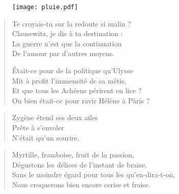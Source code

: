 \begin{figure}[h]
\centering
\texttt{[image: pluie.pdf]}
\captionsetup{labelformat=empty}
\caption[Idéotexte de la ]{}
\end{figure}

\begin{verse}
Te croyais-tu sur la redoute si malin ?\\
Clausewitz, je  dis à ta destination :\\
La guerre n’est que la continuation\\
De l’amour par d’autres moyens.

Était-ce pour de la politique qu’Ulysse\\
Mit à profit  l’immensité de sa métis,\\
Et que tous les Achéens périrent en lice ?\\
Ou bien était-ce pour ravir Hélène à Pâris ?
\end{verse}

\begin{verse}
Zygène étend ses deux ailes\\
Prête à s’envoler\\
N’était qu’un sourire.
\end{verse}

\begin{verse}
Myrtille, framboise, fruit de la passion,\\
Dégustons les délices de l’instant de braise.\\
Sans le moindre égard pour tous les qu’en-dira-t-on,\\
Nous croquerons bien encore cerise et fraise.
\end{verse}

